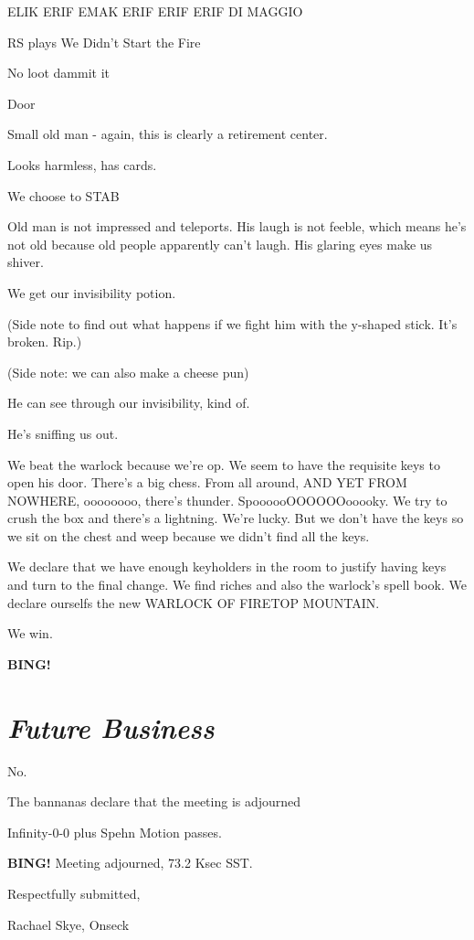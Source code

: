 \documentclass[10pt]{article}
\newcommand{\bing}{{\bf BING!} }
\newcommand{\goto}[1]{\bing \vskip 12pt \section*{{\em{#1}}}}
\newcommand{\ps}{ plus Spehn\xspace}
\newcommand{\onseck}{Rachael Skye, Onseck}
\begin{document}
ELIK ERIF
EMAK ERIF
ERIF ERIF
DI MAGGIO

RS plays We Didn't Start the Fire

No loot dammit it

Door

Small old man - again, this is clearly a retirement center.

Looks harmless, has cards.

We choose to STAB

Old man is not impressed and teleports. His laugh is not feeble, which means he's not old because old people apparently can't laugh. His glaring eyes make us shiver.

We get our invisibility potion.

(Side note to find out what happens if we fight him with the y-shaped stick. It's broken. Rip.)

(Side note: we can also make a cheese pun)

He can see through our invisibility, kind of.

He's sniffing us out.

We beat the warlock because we're op. We seem to have the requisite keys to open his door. There's a big chess. From all around, AND YET FROM NOWHERE, oooooooo, there's thunder. SpoooooOOOOOOooooky. We try to crush the box and there's a lightning. We're lucky. But we don't have the keys so we sit on the chest and weep because we didn't find all the keys.

We declare that we have enough keyholders in the room to justify having keys and turn to the final change. We find riches and also the warlock's spell book. We declare ourselfs the new WARLOCK OF FIRETOP MOUNTAIN.

We win.

\goto{Future Business}

No.

The bannanas declare that the meeting is adjourned

Infinity-0-0\ps
Motion passes.

\bing
\noindent
Meeting adjourned, 73.2 Ksec SST.

\vspace{18pt}

\centerline{Respectfully submitted,}
\centerline{\onseck}
\end{document}
